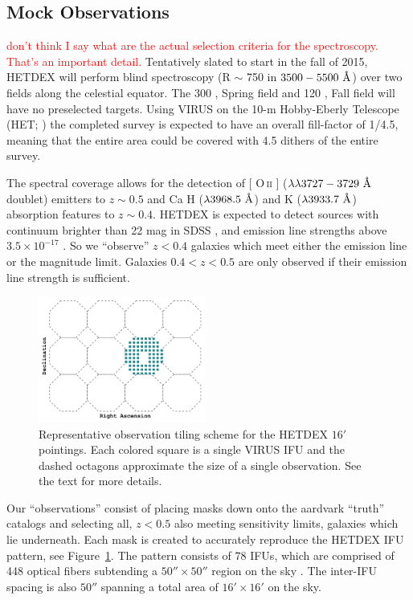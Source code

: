 \documentclass[apj, revtex4]{emulateapj}
\makeatletter
\newcommand{\editorial}[1]{\textcolor{red}{#1}}
\DeclareRobustCommand{\ion}[2]{%
\relax\ifmmode
\ifx\testbx\f@series
{\mathbf{#1\,\mathsc{#2}}}\else
{\mathrm{#1\,\mathsc{#2}}}\fi
\else\textup{#1\,{\mdseries\textsc{#2}}}%
\fi}
\makeatother
\begin{document}
\subsection{Mock Observations}\label{sec:observations}
\editorial{don't think I say what are the actual selection criteria for the spectroscopy. That's an important detail.}
Tentatively slated to start in the fall of 2015, HETDEX will perform blind spectroscopy (R $\sim$ 750 in $3500 - 5500~\hbox{\AA}$) over two fields along the celestial equator. The 300 \degsq, Spring field and 120 \degsq, Fall field will have no preselected targets. Using VIRUS on the 10-m Hobby-Eberly Telescope (HET; \citealt{Ramsey1998}) the completed survey is expected to have an overall fill-factor of 1/4.5, meaning that the entire area could be covered with 4.5 dithers of the entire survey. 

The spectral coverage allows for the detection of [\ion{O}{ii}] ($\lambda\lambda 3727-3729~\hbox{\AA}$ doublet) emitters to $z\sim 0.5$ and Ca H ($\lambda 3968.5~\hbox{\AA}$) and K ($\lambda 3933.7~\hbox{\AA}$) absorption features to $z\sim 0.4$. HETDEX is expected to detect sources with continuum brighter than 22 mag in SDSS \sdssg, and emission line strengths above $3.5\times10^{-17}$ \ergscm. So we ``observe'' $z<0.4$ galaxies which meet either the emission line or the magnitude limit. Galaxies $0.4<z<0.5$ are only observed if their emission line strength is sufficient.   

\begin{figure} 
	\includegraphics[width=0.49\textwidth]{f01.pdf} 
	\caption{Representative observation tiling scheme for the HETDEX $16'$ pointings. Each colored square is a single VIRUS IFU and the dashed octagons approximate the size of a single observation. See the text for more details.} \label{fig:ifu layout} 
\end{figure}

Our ``observations'' consist of placing masks down onto the aardvark ``truth'' catalogs and selecting all, $z< 0.5$ also meeting sensitivity limits, galaxies which lie underneath. Each mask is created to accurately reproduce the HETDEX IFU pattern, see Figure~\ref{fig:ifu layout}. The pattern consists of 78 IFUs, which are comprised of 448 optical fibers subtending a $50'' \times 50''$ region on the sky \citep{Kelz2014}. The inter-IFU spacing is also $50''$ spanning a total area of $16'\times 16'$ on the sky. 
\end{document}
